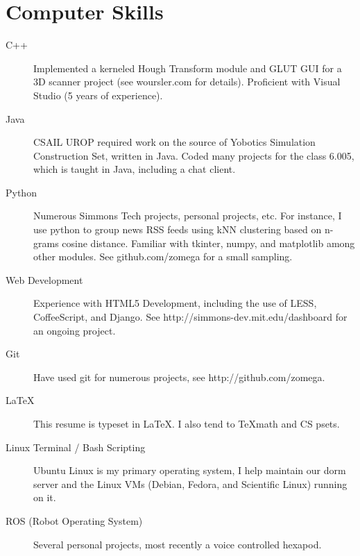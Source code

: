 \documentclass{res}
\begin{document}
\begin{resume}
\begin{tabbing}
			\end{tabbing}\vspace{-20pt}

		\section{Computer Skills}

			\begin{description}

				\item[C++] Implemented a kerneled Hough Transform module and GLUT GUI for a 3D scanner project (see woursler.com for details). Proficient with Visual Studio (5 years of experience).

				\item[Java] CSAIL UROP required work on the source of Yobotics Simulation Construction Set, written in Java. Coded many projects for the class 6.005, which is taught in Java, including a chat client.

				\item[Python] Numerous Simmons Tech projects, personal projects, etc. For instance, I use python to group news RSS feeds using kNN clustering based on n-grams cosine distance. Familiar with tkinter, numpy, and matplotlib among other modules. See github.com/zomega for a small sampling.

				\item[Web Development] Experience with HTML5 Development, including the use of LESS, CoffeeScript, and Django. See http://simmons-dev.mit.edu/dashboard for an ongoing project.

				\item[Git] Have used git for numerous projects, see http://github.com/zomega.

				\item[\LaTeX] This resume is typeset in \LaTeX. I also tend to \TeX \space math and CS psets.

				\item[Linux Terminal / Bash Scripting] Ubuntu Linux is my primary operating system, I help maintain our dorm server and the Linux VMs (Debian, Fedora, and Scientific Linux) running on it.

				\item[ROS (Robot Operating System)] Several personal projects, most recently a voice controlled hexapod.

			\end{description}
	\end{resume}
\end{document}

